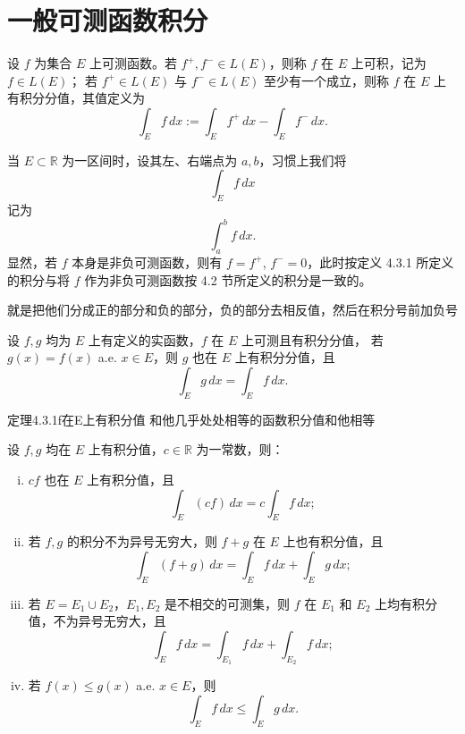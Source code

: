 \documentclass[lang=cn,10pt]{elegantbook}
\begin{document}
\section{一般可测函数积分}
\begin{definition}[4.3.1]
设 $f$ 为集合 $E$ 上可测函数。若 $f^{+}, f^{-} \in L(E)$，则称 $f$ 在 $E$ 上可积，记为 $f \in L(E)$；  
若 $f^{+} \in L(E)$ 与 $f^{-} \in L(E)$ 至少有一个成立，则称 $f$ 在 $E$ 上有积分分值，其值定义为
\[
\int_E f\,dx := \int_E f^{+}\,dx - \int_E f^{-}\,dx .
\]
\end{definition}

\begin{remark}
当 $E \subset \mathbb{R}$ 为一区间时，设其左、右端点为 $a,b$，习惯上我们将
\[
\int_E f\,dx
\]
记为
\[
\int_a^b f\,dx.
\]
显然，若 $f$ 本身是非负可测函数，则有 $f = f^{+}$, $f^{-} = 0$，此时按定义 4.3.1 所定义的积分与将 $f$ 作为非负可测函数按 4.2 节所定义的积分是一致的。
\end{remark}
就是把他们分成正的部分和负的部分，负的部分去相反值，然后在积分号前加负号
\begin{theorem}[4.3.1]
设 $f, g$ 均为 $E$ 上有定义的实函数，$f$ 在 $E$ 上可测且有积分分值，  
若 $g(x) = f(x)$ a.e. $x \in E$，则 $g$ 也在 $E$ 上有积分分值，且  
\[
\int_E g\,dx = \int_E f\,dx.
\]
\end{theorem}
定理4.3.1f在E上有积分值 和他几乎处处相等的函数积分值和他相等
\begin{theorem}[4.3.2 积分的基本性质]
设 $f, g$ 均在 $E$ 上有积分值，$c \in \mathbb{R}$ 为一常数，则：

\begin{enumerate}[(i)]
    \item $cf$ 也在 $E$ 上有积分值，且
    \[
    \int_E (cf)\,dx = c \int_E f\,dx;
    \]
    
    \item 若 $f, g$ 的积分不为异号无穷大，则 $f + g$ 在 $E$ 上也有积分值，且
    \[
    \int_E (f+g)\,dx = \int_E f\,dx + \int_E g\,dx;
    \]
    
    \item 若 $E = E_1 \cup E_2$，$E_1, E_2$ 是不相交的可测集，则 $f$ 在 $E_1$ 和 $E_2$ 上均有积分值，不为异号无穷大，且
    \[
    \int_E f\,dx = \int_{E_1} f\,dx + \int_{E_2} f\,dx;
    \]
    
    \item 若 $f(x) \le g(x)$ a.e. $x \in E$，则
    \[
    \int_E f\,dx \le \int_E g\,dx.
    \]
\end{enumerate}
\end{theorem}
\end{document}
